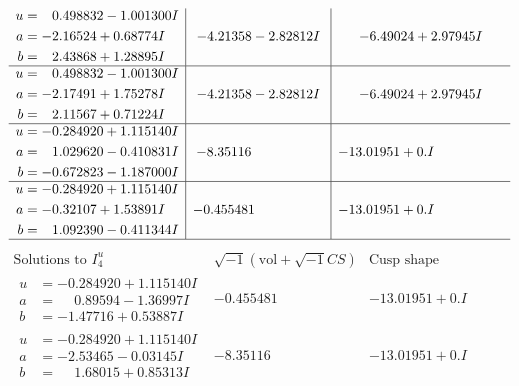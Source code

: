 \documentclass[1p]{elsarticle_modified}
\theoremstyle{definition}
\newcommand{\I}{\sqrt{-1}}
\begin{document}
$$\begin{array}{c|c|c}
\begin{aligned}
u &= \phantom{-}0.498832 - 1.001300 I \\
a &= -2.16524 + 0.68774 I \\
b &= \phantom{-}2.43868 + 1.28895 I\end{aligned}
 & -4.21358 - 2.82812 I & -6.49024 + 2.97945 I \\ \hline\begin{aligned}
u &= \phantom{-}0.498832 - 1.001300 I \\
a &= -2.17491 + 1.75278 I \\
b &= \phantom{-}2.11567 + 0.71224 I\end{aligned}
 & -4.21358 - 2.82812 I & -6.49024 + 2.97945 I \\ \hline\begin{aligned}
u &= -0.284920 + 1.115140 I \\
a &= \phantom{-}1.029620 - 0.410831 I \\
b &= -0.672823 - 1.187000 I\end{aligned}
 & -8.35116\phantom{ +0.000000I} & -13.01951 + 0. I\phantom{ +0.000000I} \\ \hline\begin{aligned}
u &= -0.284920 + 1.115140 I \\
a &= -0.32107 + 1.53891 I \\
b &= \phantom{-}1.092390 - 0.411344 I\end{aligned}
 & -0.455481\phantom{ +0.000000I} & -13.01951 + 0. I\phantom{ +0.000000I}\\
 \hline 
 \end{array}$$\newpage$$\begin{array}{c|c|c}  
\text{Solutions to }I^u_{4}& \I (\text{vol} + \sqrt{-1}CS) & \text{Cusp shape}\\
 \hline 
\begin{aligned}
u &= -0.284920 + 1.115140 I \\
a &= \phantom{-}0.89594 - 1.36997 I \\
b &= -1.47716 + 0.53887 I\end{aligned}
 & -0.455481\phantom{ +0.000000I} & -13.01951 + 0. I\phantom{ +0.000000I} \\ \hline\begin{aligned}
u &= -0.284920 + 1.115140 I \\
a &= -2.53465 - 0.03145 I \\
b &= \phantom{-}1.68015 + 0.85313 I\end{aligned}
 & -8.35116\phantom{ +0.000000I} & -13.01951 + 0. I\phantom{ +0.000000I} \\ \hline\begin{aligned}

\end{aligned}
\end{array}$$
\end{document}
